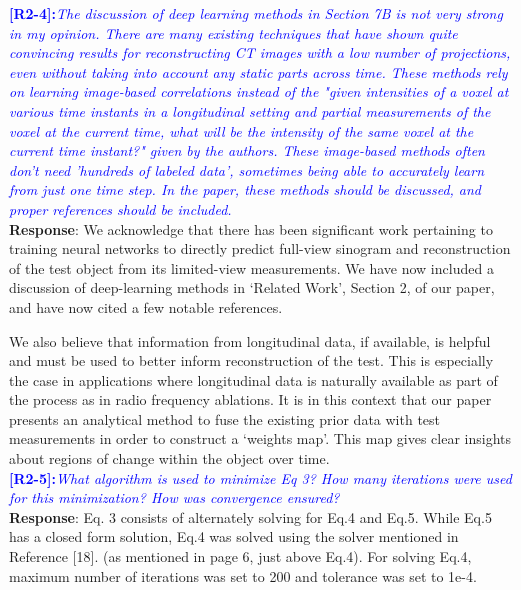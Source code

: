 \documentclass{article}
\begin{document}
\textcolor{blue}{\textbf{[R2-4]:}\textit{The discussion of deep learning methods in Section 7B is not very strong in my opinion. There are many existing techniques that have shown quite convincing results for reconstructing CT images with a low number of projections, even without taking into account any static parts across time. These methods rely on learning image-based correlations instead of the "given intensities of a voxel at various time instants in a longitudinal setting and partial measurements of the voxel at the current time, what will be the intensity of the same voxel at the current time instant?" given by the authors. These image-based methods often don't need 'hundreds of labeled data', sometimes being able to accurately learn from just one time step. In the paper, these methods should be discussed, and proper references should be included.}}\\

\textbf{Response}: We acknowledge that there has been significant work pertaining to training neural networks to directly predict full-view sinogram and reconstruction of the test object from its limited-view measurements. We have now included a discussion of deep-learning methods in `Related Work', Section 2, of our paper, and have now cited a few notable references.

We also believe that information from longitudinal data, if available, is helpful and must be used to better inform reconstruction of the test. This is especially the case in applications where longitudinal data is naturally available as part of the process as in radio frequency ablations. It is in this context that our paper presents an analytical method to fuse the existing prior data with test measurements in order to construct a `weights map'. This map gives clear insights about regions of change within the object over time.\\



\textcolor{blue}{\textbf{[R2-5]:}\textit{What algorithm is used to minimize Eq 3? How many iterations were used for this minimization? How was convergence ensured?}}\\

\textbf{Response}: Eq. 3 consists of alternately solving for Eq.4 and Eq.5. While Eq.5 has a closed form solution, Eq.4 was solved using the solver mentioned in Reference [18]. (as mentioned in page 6, just above Eq.4). 
For solving Eq.4, maximum number of iterations was set to 200 and tolerance was set to 1e-4.
\end{document}
